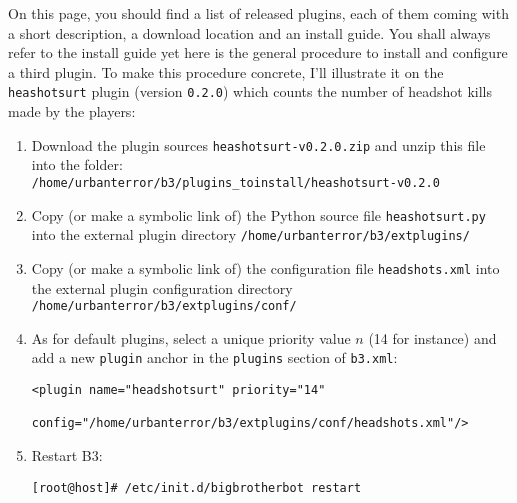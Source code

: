 \noindent 
On this page, you should find a list of released plugins, each of them coming
with a short description, a download location and an install guide. 
You shall always refer to the install guide yet here is the general procedure to
install and configure a third plugin. 
To make this procedure concrete, I'll illustrate it on the \texttt{heashotsurt}
plugin (version \texttt{0.2.0}) which counts the number of headshot kills made
by the players: 
\begin{enumerate}
\item Download the plugin sources \texttt{heashotsurt-v0.2.0.zip} and unzip this
  file into the folder:\\
  \texttt{/home/urbanterror/b3/plugins\_toinstall/heashotsurt-v0.2.0}
\item Copy (or make a symbolic link of) the Python source file
  \texttt{heashotsurt.py} into the external plugin directory 
  \texttt{/home/urbanterror/b3/extplugins/}
\item Copy (or make a symbolic link of) the  configuration file
  \texttt{headshots.xml} into the  external plugin configuration directory\\ 
  \texttt{/home/urbanterror/b3/extplugins/conf/}
\item As for default plugins, select a unique priority value $n$ (14 for
  instance) and add a new \texttt{plugin} anchor in the \texttt{plugins} section
  of \texttt{b3.xml}:
  \begin{lstlisting}[style=apachecfg]
   <plugin name="headshotsurt" priority="14"  
           config="/home/urbanterror/b3/extplugins/conf/headshots.xml"/>
  \end{lstlisting}
\item Restart B3:
\begin{lstlisting}[style=command]
[root@host]# /etc/init.d/bigbrotherbot restart
\end{lstlisting}
\end{enumerate}

